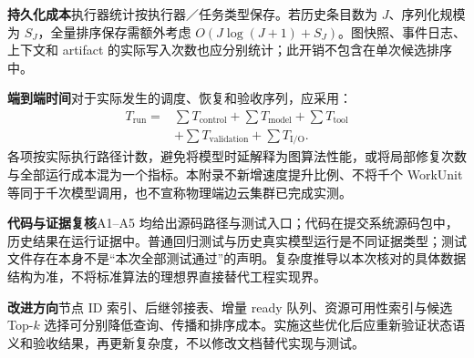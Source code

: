 \documentclass[UTF8,a4paper,11pt]{ctexart}
\newcommand{\topic}[1]{\par\noindent\textbf{#1}\quad}
\begin{document}
\topic{持久化成本}执行器统计按执行器／任务类型保存。若历史条目数为 $J$、序列化规模为 $S_J$，全量排序保存需额外考虑 $O(J\log(J+1)+S_J)$。图快照、事件日志、上下文和 artifact 的实际写入次数也应分别统计；此开销不包含在单次候选排序中。

\topic{端到端时间}对于实际发生的调度、恢复和验收序列，应采用：
\[
\begin{aligned}
T_{\mathrm{run}}
={}&\sum T_{\mathrm{control}}+\sum T_{\mathrm{model}}+\sum T_{\mathrm{tool}}\\
 &+\sum T_{\mathrm{validation}}+\sum T_{\mathrm{I/O}}.
\end{aligned}
\]
各项按实际执行路径计数，避免将模型时延解释为图算法性能，或将局部修复次数与全部运行成本混为一个指标。本附录不新增速度提升比例、不将千个 WorkUnit 等同于千次模型调用，也不宣称物理端边云集群已完成实测。

\topic{代码与证据复核}A1--A5 均给出源码路径与测试入口；代码在提交系统源码包中，历史结果在运行证据中。普通回归测试与历史真实模型运行是不同证据类型；测试文件存在本身不是“本次全部测试通过”的声明。复杂度推导以本次核对的具体数据结构为准，不将标准算法的理想界直接替代工程实现界。

\topic{改进方向}节点 ID 索引、后继邻接表、增量 ready 队列、资源可用性索引与候选 Top-$k$ 选择可分别降低查询、传播和排序成本。实施这些优化后应重新验证状态语义和验收结果，再更新复杂度，不以修改文档替代实现与测试。
\end{document}
